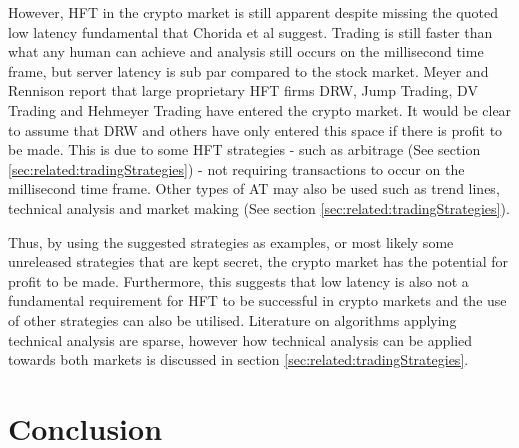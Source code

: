 However, HFT in the crypto market is still apparent despite missing the quoted low latency fundamental that Chorida et al \cite{REPORT:ChordiaEtAl:2013} suggest. Trading is still faster than what any human can achieve and analysis still occurs on the millisecond time frame, but server latency is sub par compared to the stock market. Meyer and Rennison \cite{ART:Meyer:2017} report that large proprietary HFT firms DRW, Jump Trading, DV Trading and Hehmeyer Trading have entered the crypto market. It would be clear to assume that DRW and others have only entered this space if there is profit to be made. This is due to some HFT strategies - such as arbitrage (See section \ref{sec:related:tradingStrategies}) - not requiring transactions to occur on the millisecond time frame. Other types of AT may also be used such as trend lines, technical analysis and market making (See section \ref{sec:related:tradingStrategies}). 

Thus, by using the suggested strategies as examples, or most likely some unreleased strategies that are kept secret, the crypto market has the potential for profit to be made. Furthermore, this suggests that low latency is also not a fundamental requirement for HFT to be successful in crypto markets and the use of other strategies can also be utilised. Literature on algorithms applying technical analysis are sparse, however how technical analysis can be applied towards both markets is discussed in section \ref{sec:related:tradingStrategies}.


\section{Conclusion}
\label{sec:related:conclusion}

